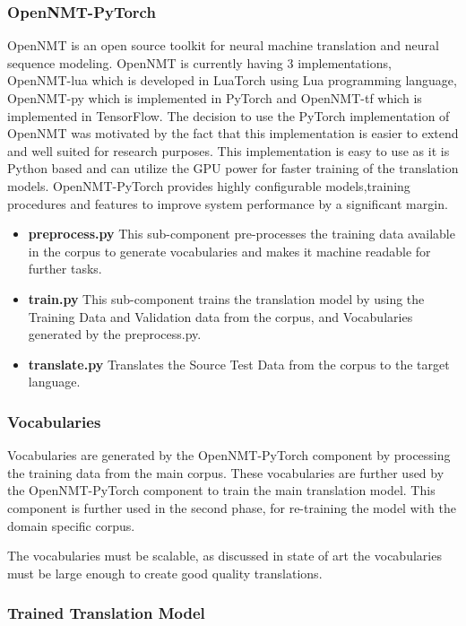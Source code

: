 \subsubsection{OpenNMT-PyTorch}
\label{sec:opennmt}
OpenNMT is an open source toolkit for neural machine translation and neural sequence modeling. OpenNMT is currently having 3 implementations, OpenNMT-lua which is developed in LuaTorch using Lua programming language, OpenNMT-py which is implemented in PyTorch and OpenNMT-tf which is implemented in TensorFlow. The decision to use the PyTorch implementation of OpenNMT was motivated by the fact that this implementation is easier to extend and well suited for research purposes. This implementation is easy to use as it is Python based and can utilize the GPU power for faster training of the translation models. OpenNMT-PyTorch provides highly configurable models,training procedures and features to improve system performance by a significant margin.

\begin{itemize}
    \item \textbf{preprocess.py} This sub-component pre-processes the training data available in the corpus to generate vocabularies and makes it machine readable for further tasks.
    \item \textbf{train.py} This sub-component trains the translation model by using the Training Data and Validation data from the corpus, and Vocabularies generated by the preprocess.py.
    \item \textbf{translate.py} Translates the Source Test Data from the corpus to the target language.
\end{itemize}

\subsubsection{Vocabularies} 
Vocabularies are generated by the OpenNMT-PyTorch component by processing the training data from the main corpus. These vocabularies are further used by the OpenNMT-PyTorch component to train the main translation model. This component is further used in the second phase, for re-training the model with the domain specific corpus.

The vocabularies must be scalable, as discussed in state of art the vocabularies must be large enough to create good quality translations. 

\subsubsection{Trained Translation Model} 

